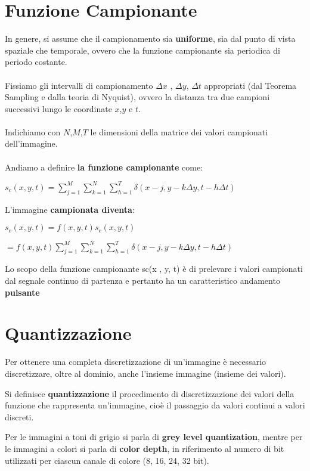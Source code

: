 \section{Funzione Campionante}
In genere, si assume che il campionamento sia \textbf{uniforme}, sia dal punto di vista spaziale che temporale, ovvero che la funzione campionante sia periodica di periodo costante.
\\\\Fissiamo gli intervalli di campionamento $\Delta x$ , $\Delta y$, $\Delta t$ appropriati (dal Teorema Sampling e dalla teoria di Nyquist), ovvero la
distanza tra due campioni successivi lungo le coordinate $x$,$y$ e $t$.
\\\\Indichiamo con $N$,$M$,$T$ le dimensioni della matrice dei valori campionati dell’immagine.
\\\\Andiamo a definire \textbf{la funzione campionante} come:
\begin{center}
    $s_c(x,y,t) = \sum_{j=1}^{M} \sum_{k=1}^{N}\sum_{h=1}^{T} \delta (x-j, y - k \Delta y, t - h  \Delta t )$
\end{center}
L'immagine \textbf{campionata diventa}:
\begin{center}
    $s_c(x,y,t) = f(x,y,t)s_c(x,y,t)$
\end{center}
\begin{center}
    $= f(x,y,t) \sum_{j=1}^{M} \sum_{k=1}^{N}\sum_{h=1}^{T} \delta (x-j, y - k \Delta y, t - h  \Delta t )$
\end{center}
Lo scopo della funzione campionante sc(x , y, t) è di prelevare i
valori campionati dal segnale continuo di partenza e pertanto ha
un caratteristico andamento \textbf{pulsante}


\section{Quantizzazione}
Per ottenere una completa discretizzazione di un’immagine è
necessario discretizzare, oltre al dominio, anche l’insieme immagine
(insieme dei valori).
\begin{definition}
    Si definisce \textbf{quantizzazione} il procedimento di discretizzazione dei
    valori della funzione che rappresenta un’immagine, cioè il passaggio
    da valori continui a valori discreti.
\end{definition}
Per le immagini a toni di grigio si parla di \textbf{grey level quantization},
mentre per le immagini a colori si parla di \textbf{color depth}, in
riferimento al numero di bit utilizzati per ciascun canale di colore
(8, 16, 24, 32 bit).

